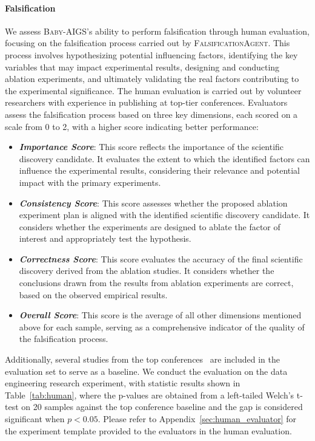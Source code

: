 \documentclass{article} %
\newcommand{\AIGSSys}{\textsc{Baby-AIGS}\xspace}
\newcommand{\FalsificationAgent}{\textsc{FalsificationAgent}\xspace}
\begin{document}
\paragraph{Falsification} We assess \AIGSSys’s ability to perform falsification through human evaluation, focusing on the falsification process carried out by \FalsificationAgent. This process involves hypothesizing potential influencing factors, identifying the key variables that may impact experimental results, designing and conducting ablation experiments, and ultimately validating the real factors contributing to the experimental significance. The human evaluation is carried out by volunteer researchers with experience in publishing at top-tier conferences. Evaluators assess the falsification process based on three key dimensions, each scored on a scale from 0 to 2, with a higher score indicating better performance:
\begin{itemize}
    \item \textit{\textbf{Importance Score}}: This score reflects the importance of the scientific discovery candidate. It evaluates the extent to which the identified factors can influence the experimental results, considering their relevance and potential impact with the primary experiments.
    \item \textit{\textbf{Consistency Score}}: This score assesses whether the proposed ablation experiment plan is aligned with the identified scientific discovery candidate. It considers whether the experiments are designed to ablate the factor of interest and appropriately test the hypothesis.
    \item \textit{\textbf{Correctness Score}}: This score evaluates the accuracy of the final scientific discovery derived from the ablation studies. It considers whether the conclusions drawn from the results from ablation experiments are correct, based on the observed empirical results. 
    \item \textit{\textbf{Overall Score}}: This score is the average of all other dimensions mentioned above for each sample, serving as a comprehensive indicator of the quality of the falsification process. 
\end{itemize}
Additionally, several studies from the top conferences~\citep{deita, chen2024alpagasus, li-etal-2024-one, long-is-more} are included in the evaluation set to serve as a baseline. We conduct the evaluation on the data engineering research experiment, with statistic results shown in Table~\ref{tab:human}, where the p-values are obtained from a left-tailed Welch’s t-test on 20 samples against the top conference baseline and the gap is considered significant when $p<0.05$. Please refer to Appendix~\ref{sec:human_evaluator} for the experiment template provided to the evaluators in the human evaluation. 
\end{document}

